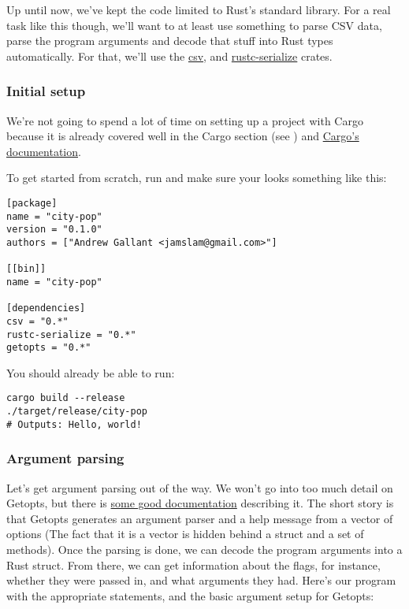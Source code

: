 \blank

Up until now, we've kept the code limited to Rust's standard library. For a real task like this though, we'll want to at 
least use something to parse CSV data, parse the program arguments and decode that stuff into Rust types automatically. For 
that, we'll use the \href{https://crates.io/crates/csv}{csv}, and 
\href{https://crates.io/crates/rustc-serialize}{rustc-serialize} crates.

\subsubsection*{Initial setup}

We're not going to spend a lot of time on setting up a project with Cargo because it is already covered well in the Cargo section 
(see ) and \href{http://doc.crates.io/guide.html}{Cargo's documentation}.

\blank

To get started from scratch, run  and make sure your  looks something like this:

\begin{verbatim}
[package]
name = "city-pop"
version = "0.1.0"
authors = ["Andrew Gallant <jamslam@gmail.com>"]

[[bin]]
name = "city-pop"

[dependencies]
csv = "0.*"
rustc-serialize = "0.*"
getopts = "0.*"
\end{verbatim}

You should already be able to run:

\begin{verbatim}
cargo build --release
./target/release/city-pop
# Outputs: Hello, world!
\end{verbatim}

\subsubsection*{Argument parsing}

Let's get argument parsing out of the way. We won't go into too much detail on Getopts, but there is 
\href{http://doc.rust-lang.org/getopts/getopts/}{some good documentation} describing it. The short story is that Getopts 
generates an argument parser and a help message from a vector of options (The fact that it is a vector is hidden behind a 
struct and a set of methods). Once the parsing is done, we can decode the program arguments into a Rust struct. From there, 
we can get information about the flags, for instance, whether they were passed in, and what arguments they had. Here's our
 program with the appropriate  statements, and the basic argument setup for Getopts:

